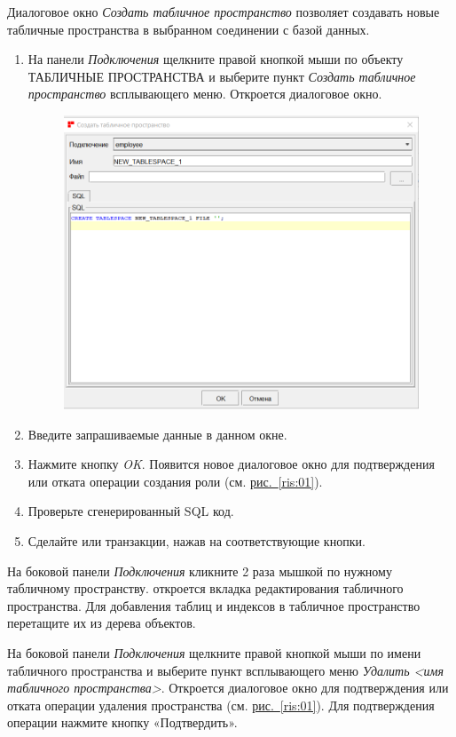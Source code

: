 

Диалоговое окно \textit{Создать табличное пространство} позволяет создавать новые табличные пространства в выбранном соединении с базой данных.

\begin{enumerate}[leftmargin=26pt]
	\item На панели \textit{Подключения} щелкните правой кнопкой мыши по объекту ТАБЛИЧНЫЕ ПРОСТРАНСТВА и выберите пункт \textit{Создать табличное пространство} всплывающего меню. Откроется диалоговое окно.
	\begin{figure}[H]
		\centering
		\includegraphics[width = 0.6\linewidth]{img/create_tablespace.png}
	\end{figure}
	\item Введите запрашиваемые данные в данном окне.
	\item Нажмите кнопку \textit{OK}. Появится новое диалоговое окно для подтверждения или отката операции создания роли (см. \hyperref[ris:01]{рис.~\ref{ris:01}}).
	\item Проверьте сгенерированный SQL код.
	\item Сделайте  или  транзакции, нажав на соответствующие кнопки.
\end{enumerate}

На боковой панели \textit{Подключения} кликните 2 раза мышкой по нужному табличному пространству. откроется вкладка редактирования табличного пространства. Для добавления таблиц и индексов в табличное пространство перетащите их из дерева объектов. 

На боковой панели \textit{Подключения} щелкните правой кнопкой мыши по имени табличного пространства и выберите пункт всплывающего меню \textit{Удалить <имя табличного пространства>}. Откроется  диалоговое окно для подтверждения или отката операции удаления пространства (см. \hyperref[ris:01]{рис.~\ref{ris:01}}). Для подтверждения операции нажмите кнопку «Подтвердить».
\newpage

